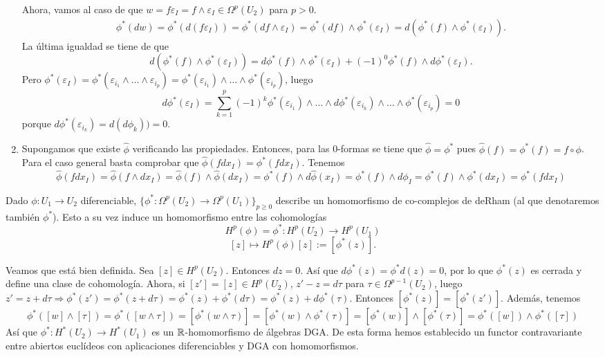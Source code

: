 \documentclass[CV.tex]{subfiles}
\begin{document}
\begin{dem}
\begin{enumerate}
Ahora, vamos al caso de que $w=f\varepsilon_I=f\land\varepsilon_I\in\Omega^p(U_2)$ para $p>0$. 
\begin{gather*}
\phi^*(dw)=\phi^*(d(f\varepsilon_I))=\phi^*(df\land\varepsilon_I)=\phi^*(df)\land\phi^*(\varepsilon_I)=d(\phi^*(f)\land\phi^*(\varepsilon_I)).
\end{gather*}
La última igualdad se tiene de que
\[
d(\phi^*(f)\land\phi^*(\varepsilon_I))=d\phi^*(f)\land\phi^*(\varepsilon_I)+(-1)^0\phi^*(f)\land d\phi^*(\varepsilon_I).
\]
Pero $\phi^*(\varepsilon_I)=\phi^*(\varepsilon_{i_1}\land\dots\land\varepsilon_{i_p})=\phi^*(\varepsilon_{i_1})\land\dots\land\phi^*(\varepsilon_{i_p})$, luego
\[
d\phi^*(\varepsilon_I)=\sum_{k=1}^p(-1)^k\phi^*(\varepsilon_{i_1})\land\dots\land d\phi^*(\varepsilon_{i_k})\land\dots\land \phi^*(\varepsilon_{i_p})=0
\]
porque $d\phi^*(\varepsilon_{i_k})=d(d\phi_k))=0$.

\item Supongamos que existe $\hat{\phi}$ verificando las propiedades. Entonces, para las 0-formas se tiene que $\hat{\phi}=\phi^*$ pues $\hat{\phi}(f)=\phi^*(f)=f\circ\phi$. Para el caso general basta comprobar que $\hat{\phi}(f dx_I)=\phi^*(fdx_I)$. Tenemos
\[\hat{\phi}(fdx_I)=\hat{\phi}(f\land dx_I)=\hat{\phi}(f)\land \hat{\phi}(dx_I)=\phi^*(f)\land d\hat{\phi}(x_I)=\phi^*(f)\land d\phi_I=\phi^*(f)\land\phi^*(dx_I)=\phi^*(f dx_I)
\]
\end{enumerate}
\QED
\end{dem}

Dado $\phi:U_1\to U_2$ diferenciable, $\{\phi^*:\Omega^p(U_2)\to\Omega^p(U_1)\}_{p\geq 0}$ describe un homomorfismo de co-complejos de deRham (al que denotaremos también $\phi^*$). Esto a su vez induce un homomorfismo entre las cohomologías
\[
H^p(\phi)=\phi^*:H^p(U_2)\to H^p(U_1)
\]
\[
[z]\mapsto H^p(\phi)[z]:=[\phi^*(z)].
\]

Veamos que está bien definida. Sea $[z]\in H^p(U_2)$. Entonces $dz=0$. Así que $d\phi^*(z)=\phi^*d(z)=0$, por lo que $\phi^*(z)$ es cerrada y define una clase de cohomología. Ahora, si $[z']=[z]\in H^p(U_2)$, $z'-z=d\tau$ para $\tau\in\Omega^{p-1}(U_2)$, luego $z'=z+d\tau\Rightarrow \phi^*(z')=\phi^*(z+d\tau)=\phi^*(z)+\phi^*(d\tau)=\phi^*(z)+d\phi^*(\tau)$. Entonces $[\phi^*(z)]=[\phi^*(z')]$. Además, tenemos
\[
\phi^*([w]\land[\tau])=\phi^*([w\land\tau])=[\phi^*(w\land\tau)]=[\phi^*(w)\land\phi^*(\tau)]=[\phi^*(w)]\land[\phi^*(\tau)]=\phi^*([w])\land\phi^*([\tau])
\]
Así que $\phi^*:H^*(U_2)\to H^*(U_1)$ es un $\mathbb{R}$-homomorfismo de álgebras DGA. De esta forma hemos establecido un functor contravariante entre abiertos euclídeos con aplicaciones diferenciables y  DGA con homomorfismos.
\end{document}
